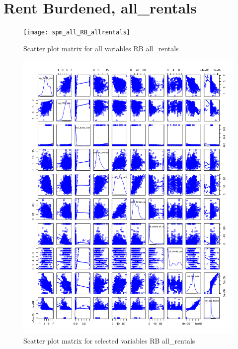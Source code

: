 \documentclass[10pt, letterpaper]{amsart}
\begin{document}
\section{Rent Burdened, all\_rentals}

\begin{figure}[H]
  \caption{Scatter plot matrix for all variables RB all\_rentals}
  \texttt{[image: spm\_all\_RB\_allrentals]}
\end{figure}

\begin{figure}[H]
  \caption{Scatter plot matrix for selected variables RB all\_rentals}
  \includegraphics[scale=0.6]{spm_selected_RB_allrentals}
\end{figure}
\end{document}
